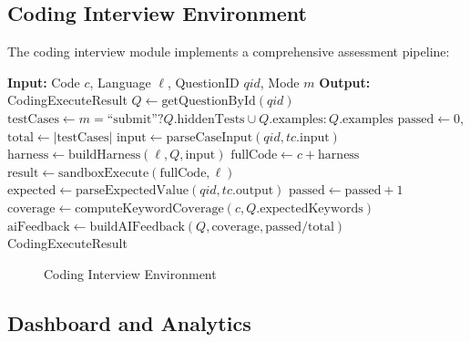 \documentclass[12pt,a4paper,oneside]{report}
\begin{document}
\subsection{Coding Interview Environment}

The coding interview module implements a comprehensive assessment pipeline:

\begin{algorithm}[H]
\caption{Code Execution and Evaluation Algorithm}
\label{alg:code_execution}
\begin{algorithmic}[1]
\STATE \textbf{Input:} Code $c$, Language $\ell$, QuestionID $qid$, Mode $m$
\STATE \textbf{Output:} CodingExecuteResult
\STATE $Q \gets \text{getQuestionById}(qid)$
\STATE $\text{testCases} \gets m = \text{``submit''} ? Q.\text{hiddenTests} \cup Q.\text{examples} : Q.\text{examples}$
\STATE $\text{passed} \gets 0$, $\text{total} \gets |\text{testCases}|$
  \STATE $\text{input} \gets \text{parseCaseInput}(qid, tc.\text{input})$
  \STATE $\text{harness} \gets \text{buildHarness}(\ell, Q, \text{input})$
  \STATE $\text{fullCode} \gets c + \text{harness}$
  \STATE $\text{result} \gets \text{sandboxExecute}(\text{fullCode}, \ell)$
  \STATE $\text{expected} \gets \text{parseExpectedValue}(qid, tc.\text{output})$
    \STATE $\text{passed} \gets \text{passed} + 1$
  \ENDIF
\ENDFOR
\STATE $\text{coverage} \gets \text{computeKeywordCoverage}(c, Q.\text{expectedKeywords})$
\STATE $\text{aiFeedback} \gets \text{buildAIFeedback}(Q, \text{coverage}, \text{passed}/\text{total})$
\RETURN CodingExecuteResult
\end{algorithmic}
\end{algorithm}

\begin{figure}[H]
\centering
{}
\caption{Coding Interview Environment}
\label{fig:coding_interview}
\end{figure}


\subsection{Dashboard and Analytics}
\end{document}
